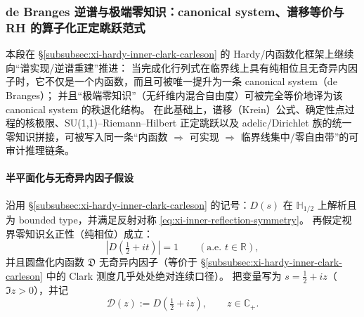 \subsubsection{de Branges 逆谱与极端零知识：canonical system、谱移等价与 RH 的算子化正定跳跃范式}\label{subsubsec:xi-debranges-canonical-rhp-adelic}
本段在 \S\ref{subsubsec:xi-hardy-inner-clark-carleson} 的 Hardy/内函数化框架上继续向“谱实现/逆谱重建”推进：
当完成化行列式在临界线上具有纯相位且无奇异内因子时，它不仅是一个内函数，而且可被唯一提升为一条 canonical system（de Branges）；
并且“极端零知识”（无纤维内混合自由度）可被完全等价地译为该 canonical system 的秩退化结构。
在此基础上，谱移（Krein）公式、确定性点过程的核极限、SU(1,1)–Riemann--Hilbert 正定跳跃以及 adelic/Dirichlet 族的统一零知识拼接，可被写入同一条“内函数 \(\Rightarrow\) 可实现 \(\Rightarrow\) 临界线集中/零自由带”的可审计推理链条。

\paragraph{半平面化与无奇异内因子假设}
沿用 \S\ref{subsubsec:xi-hardy-inner-clark-carleson} 的记号：\(D(s)\) 在 \(\mathbb{H}_{1/2}\) 上解析且为 bounded type，并满足反射对称 \eqref{eq:xi-inner-reflection-symmetry}。
再假定视界零知识幺正性（纯相位）成立：
\[
|D(\tfrac12+it)|=1\qquad(\text{a.e. }t\in\mathbb{R}),
\]
并且圆盘化内函数 \(\mathfrak{D}\) 无奇异内因子（等价于 \S\ref{subsubsec:xi-hardy-inner-clark-carleson} 中的 Clark 测度几乎处处绝对连续口径）。
把变量写为 \(s=\tfrac12+iz\)（\(\Im z>0\)），并记
\[
\mathcal{D}(z):=D(\tfrac12+iz),
\qquad z\in\mathbb{C}_+.
\]

